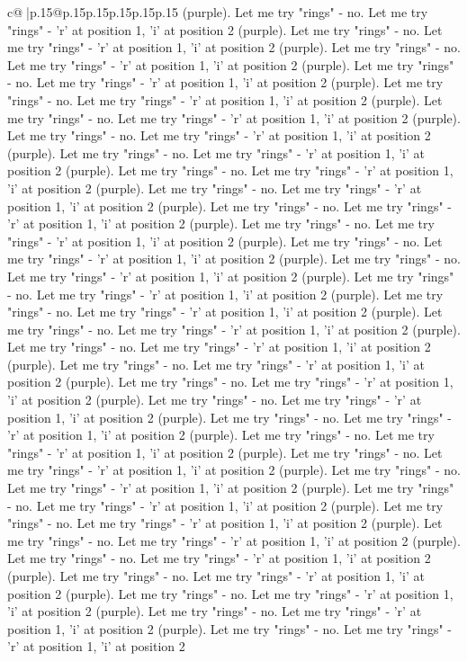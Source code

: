 \documentclass{article}
\begin{document}
{\begin{supertabular}{c@{$\;$}|p{.15\linewidth}@{}p{.15\linewidth}p{.15\linewidth}p{.15\linewidth}p{.15\linewidth}p{.15\linewidth}}
{{{(purple). Let me try "rings" {-} no. Let me try "rings" {-} 'r' at position 1, 'i' at position 2 (purple). Let me try "rings" {-} no. Let me try "rings" {-} 'r' at position 1, 'i' at position 2 (purple). Let me try "rings" {-} no. Let me try "rings" {-} 'r' at position 1, 'i' at position 2 (purple). Let me try "rings" {-} no. Let me try "rings" {-} 'r' at position 1, 'i' at position 2 (purple). Let me try "rings" {-} no. Let me try "rings" {-} 'r' at position 1, 'i' at position 2 (purple). Let me try "rings" {-} no. Let me try "rings" {-} 'r' at position 1, 'i' at position 2 (purple). Let me try "rings" {-} no. Let me try "rings" {-} 'r' at position 1, 'i' at position 2 (purple). Let me try "rings" {-} no. Let me try "rings" {-} 'r' at position 1, 'i' at position 2 (purple). Let me try "rings" {-} no. Let me try "rings" {-} 'r' at position 1, 'i' at position 2 (purple). Let me try "rings" {-} no. Let me try "rings" {-} 'r' at position 1, 'i' at position 2 (purple). Let me try "rings" {-} no. Let me try "rings" {-} 'r' at position 1, 'i' at position 2 (purple). Let me try "rings" {-} no. Let me try "rings" {-} 'r' at position 1, 'i' at position 2 (purple). Let me try "rings" {-} no. Let me try "rings" {-} 'r' at position 1, 'i' at position 2 (purple). Let me try "rings" {-} no. Let me try "rings" {-} 'r' at position 1, 'i' at position 2 (purple). Let me try "rings" {-} no. Let me try "rings" {-} 'r' at position 1, 'i' at position 2 (purple). Let me try "rings" {-} no. Let me try "rings" {-} 'r' at position 1, 'i' at position 2 (purple). Let me try "rings" {-} no. Let me try "rings" {-} 'r' at position 1, 'i' at position 2 (purple). Let me try "rings" {-} no. Let me try "rings" {-} 'r' at position 1, 'i' at position 2 (purple). Let me try "rings" {-} no. Let me try "rings" {-} 'r' at position 1, 'i' at position 2 (purple). Let me try "rings" {-} no. Let me try "rings" {-} 'r' at position 1, 'i' at position 2 (purple). Let me try "rings" {-} no. Let me try "rings" {-} 'r' at position 1, 'i' at position 2 (purple). Let me try "rings" {-} no. Let me try "rings" {-} 'r' at position 1, 'i' at position 2 (purple). Let me try "rings" {-} no. Let me try "rings" {-} 'r' at position 1, 'i' at position 2 (purple). Let me try "rings" {-} no. Let me try "rings" {-} 'r' at position 1, 'i' at position 2 (purple). Let me try "rings" {-} no. Let me try "rings" {-} 'r' at position 1, 'i' at position 2 (purple). Let me try "rings" {-} no. Let me try "rings" {-} 'r' at position 1, 'i' at position 2 (purple). Let me try "rings" {-} no. Let me try "rings" {-} 'r' at position 1, 'i' at position 2 (purple). Let me try "rings" {-} no. Let me try "rings" {-} 'r' at position 1, 'i' at position 2 (purple). Let me try "rings" {-} no. Let me try "rings" {-} 'r' at position 1, 'i' at position 2 (purple). Let me try "rings" {-} no. Let me try "rings" {-} 'r' at position 1, 'i' at position 2 (purple). Let me try "rings" {-} no. Let me try "rings" {-} 'r' at position 1, 'i' at position 2 (purple). Let me try "rings" {-} no. Let me try "rings" {-} 'r' at position 1, 'i' at position 2 (purple). Let me try "rings" {-} no. Let me try "rings" {-} 'r' at position 1, 'i' at position 2 }}}
\end{supertabular}}
\end{document}
